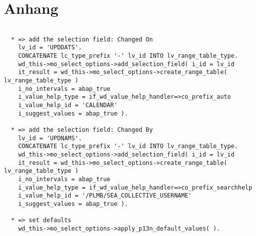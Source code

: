 \chapter{Anhang}\label{anhang}

\begin{lstlisting} 
      
  * => add the selection field: Changed On
    lv_id = 'UPDDATS'.
    CONCATENATE lc_type_prefix '-' lv_id INTO lv_range_table_type.
    wd_this->mo_select_options->add_selection_field( i_id = lv_id
    it_result = wd_this->mo_select_options->create_range_table( lv_range_table_type )
    i_no_intervals = abap_true
    i_value_help_type = if_wd_value_help_handler=>co_prefix_auto
    i_value_help_id = 'CALENDAR'
    i_suggest_values = abap_true ).
  
  * => add the selection field: Changed By
    lv_id = 'UPDNAMS'.
    CONCATENATE lc_type_prefix '-' lv_id INTO lv_range_table_type.
    wd_this->mo_select_options->add_selection_field( i_id = lv_id
    it_result = wd_this->mo_select_options->create_range_table( lv_range_table_type )
    i_no_intervals = abap_true
    i_value_help_type = if_wd_value_help_handler=>co_prefix_searchhelp
    i_value_help_id = '/PLMB/SEA_COLLECTIVE_USERNAME'
    i_suggest_values = abap_true ).
  
  * => set defaults
    wd_this->mo_select_options->apply_p13n_default_values( ).

\end{lstlisting}


